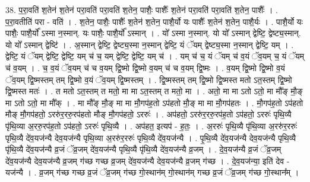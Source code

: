 \documentclass[17pt]{extarticle}
\begin{document}
38. प॒रा॒वति॑ श॒तेन॑ श॒तेन॑ परा॒वति॑ परा॒वति॑ श॒तेन॒ पाशैः॒ पाशैः᳚ श॒तेन॑ परा॒वति॑ परा॒वति॑ श॒तेन॒ पाशैः᳚ । . प॒रा॒वतीति॑ परा - वति॑ । . श॒तेन॒ पाशैः॒ पाशैः᳚ श॒तेन॑ श॒तेन॒ पाशै॒र्यो यः पाशैः᳚ श॒तेन॑ श॒तेन॒ पाशै॒र्यः । . पाशै॒र्यो यः पाशैः॒ पाशै॒र्यो᳚ ऽस्मा न॒स्मान्. यः पाशैः॒ पाशै॒र्यो᳚ ऽस्मान् । . यो᳚ ऽस्मा न॒स्मान्. यो यो᳚ ऽस्मान् द्वेष्टि॒ द्वेष्ट्य॒स्मान्. यो यो᳚ ऽस्मान् द्वेष्टि॑ । . अ॒स्मान् द्वेष्टि॒ द्वेष्ट्य॒स्मा न॒स्मान् द्वेष्टि॒ यं ॅयम् द्वेष्ट्य॒स्मा न॒स्मान् द्वेष्टि॒ यम् । . द्वेष्टि॒ यं ॅयम् द्वेष्टि॒ द्वेष्टि॒ यम् च॑ च॒ यम् द्वेष्टि॒ द्वेष्टि॒ यम् च॑ । . यम् च॑ च॒ यं ॅयम् च॑ व॒यं ॅव॒यम् च॒ यं ॅयम् च॑ व॒यम् । . च॒ व॒यं ॅव॒यम् च॑ च व॒यम् द्वि॒ष्मो द्वि॒ष्मो व॒यम् च॑ च व॒यम् द्वि॒ष्मः । . व॒यम् द्वि॒ष्मो द्वि॒ष्मो व॒यं ॅव॒यम् द्वि॒ष्मस्तम् तम् द्वि॒ष्मो व॒यं ॅव॒यम् द्वि॒ष्मस्तम् । . द्वि॒ष्मस्तम् तम् द्वि॒ष्मो द्वि॒ष्मस्त मतो ऽत॒स्तम् द्वि॒ष्मो द्वि॒ष्मस्त मतः॑ । . त मतो ऽत॒स्तम् त मतो॒ मा मा ऽत॒स्तम् त मतो॒ मा । . अतो॒ मा मा ऽतो ऽतो॒ मा मौ᳚ङ् मौ॒ङ् मा ऽतो ऽतो॒ मा मौ᳚क् । . मा मौ᳚ङ् मौ॒ङ् मा मा मौ॒गप॑ह॒तो ऽप॑हतो मौ॒ङ् मा मा मौ॒गप॑हतः । . मौ॒गप॑ह॒तो ऽप॑हतो मौङ् मौ॒गप॑हतो॒ ऽररु॑र॒ररु॒रप॑हतो मौङ् मौ॒गप॑हतो॒ ऽररुः॑ । . अप॑हतो॒ ऽररु॑र॒ररु॒रप॑ह॒तो ऽप॑हतो॒ ऽररुः॑ पृथि॒व्यै पृ॑थि॒व्या अ॒ररु॒रप॑ह॒तो ऽप॑हतो॒ ऽररुः॑ पृथि॒व्यै । . अप॑हत॒ इत्यप॑ - ह॒तः॒ । . अ॒ररुः॑ पृथि॒व्यै पृ॑थि॒व्या अ॒ररु॑र॒ररुः॑ पृथि॒व्यै दे॑व॒यज॑न्यै देव॒यज॑न्यै पृथि॒व्या अ॒ररु॑र॒ररुः॑ पृथि॒व्यै दे॑व॒यज॑न्यै । . पृ॒थि॒व्यै दे॑व॒यज॑न्यै देव॒यज॑न्यै पृथि॒व्यै पृ॑थि॒व्यै दे॑व॒यज॑न्यै व्र॒जं ॅव्र॒जम् दे॑व॒यज॑न्यै पृथि॒व्यै पृ॑थि॒व्यै दे॑व॒यज॑न्यै व्र॒जम् । . दे॒व॒यज॑न्यै व्र॒जं ॅव्र॒जम् दे॑व॒यज॑न्यै देव॒यज॑न्यै व्र॒जम् ग॑च्छ गच्छ व्र॒जम् दे॑व॒यज॑न्यै देव॒यज॑न्यै व्र॒जम् ग॑च्छ । . दे॒व॒यज॑न्या॒ इति॑ देव - यज॑न्यै । . व्र॒जम् ग॑च्छ गच्छ व्र॒जं ॅव्र॒जम् ग॑च्छ गो॒स्थान॑म् गो॒स्थान॑म् गच्छ व्र॒जं ॅव्र॒जम् ग॑च्छ गो॒स्थान᳚म् । \newline
\pagebreak
{}
\end{document}
